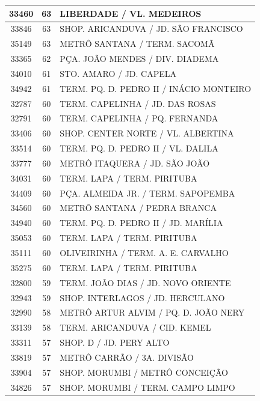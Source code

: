 \documentclass[
	12pt,				%
	oneside,			%
	a4paper,			%
	english,			%
	brazil				%
	]{abntex2ppgsi}
\begin{document}
\begin{apendicesenv}
\begin{longtable}{c|c|p{7cm}}
\hline
    33460 & 63    & LIBERDADE / VL. MEDEIROS \\
\hline
    33846 & 63    & SHOP. ARICANDUVA / JD. SÃO FRANCISCO \\
\hline
    35149 & 63    & METRÔ SANTANA / TERM. SACOMÃ \\
\hline
    33365 & 62    & PÇA. JOÃO MENDES / DIV. DIADEMA \\
\hline
    34010 & 61    & STO. AMARO / JD. CAPELA \\
\hline
    34942 & 61    & TERM. PQ. D. PEDRO II / INÁCIO MONTEIRO \\
\hline
    32787 & 60    & TERM. CAPELINHA / JD. DAS ROSAS \\
\hline
    32791 & 60    & TERM. CAPELINHA / PQ. FERNANDA \\
\hline
    33406 & 60    & SHOP. CENTER NORTE / VL. ALBERTINA \\
\hline
    33514 & 60    & TERM. PQ. D. PEDRO II / VL. DALILA \\
\hline
    33777 & 60    & METRÔ ITAQUERA / JD. SÃO JOÃO \\
\hline
    34031 & 60    & TERM. LAPA / TERM. PIRITUBA \\
\hline
    34409 & 60    & PÇA. ALMEIDA JR. / TERM. SAPOPEMBA \\
\hline
    34560 & 60    & METRÔ SANTANA / PEDRA BRANCA \\
\hline
    34940 & 60    & TERM. PQ. D. PEDRO II / JD. MARÍLIA \\
\hline
    35053 & 60    & TERM. LAPA / TERM. PIRITUBA \\
\hline
    35111 & 60    & OLIVEIRINHA / TERM. A. E. CARVALHO \\
\hline
    35275 & 60    & TERM. LAPA / TERM. PIRITUBA \\
\hline
    32800 & 59    & TERM. JOÃO DIAS / JD. NOVO ORIENTE \\
\hline
    32943 & 59    & SHOP. INTERLAGOS / JD. HERCULANO \\
\hline
    32990 & 58    & METRÔ ARTUR ALVIM / PQ. D. JOÃO NERY \\
\hline
    33139 & 58    & TERM. ARICANDUVA / CID. KEMEL \\
\hline
    33311 & 57    & SHOP. D / JD. PERY ALTO \\
\hline
    33819 & 57    & METRÔ CARRÃO / 3A. DIVISÃO \\
\hline
    33904 & 57    & SHOP. MORUMBI / METRÔ CONCEIÇÃO \\
\hline
    34826 & 57    & SHOP. MORUMBI / TERM. CAMPO LIMPO \\

\end{longtable}
\end{apendicesenv}
\end{document}

